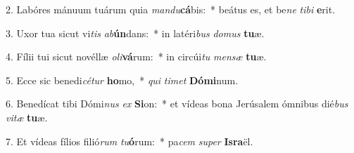 2. Labóres mánuum tuárum quia \textit{man}\textit{du}\textbf{cá}bis:~*  beátus es, et be\textit{ne} \textit{ti}\textit{bi} \textbf{e}rit.\

3. Uxor tua sicut vi\textit{tis} \textit{ab}\textbf{ún}dans:~*  in latéri\textit{bus} \textit{do}\textit{mus} \textbf{tu}æ.\

4. Fílii tui sicut novéllæ \textit{o}\textit{li}\textbf{vá}rum:~*  in circúi\textit{tu} \textit{men}\textit{sæ} \textbf{tu}æ.\

5. Ecce sic benedi\textit{cé}\textit{tur} \textbf{ho}mo,~*  \textit{qui} \textit{ti}\textit{met} \textbf{Dó}\textbf{mi}num.\

6. Benedícat tibi Dómi\textit{nus} \textit{ex} \textbf{Si}on:~*  et vídeas bona Jerúsalem ómnibus dié\textit{bus} \textit{vi}\textit{tæ} \textbf{tu}æ.\

7. Et vídeas fílios filió\textit{rum} \textit{tu}\textbf{ó}rum:~*  pa\textit{cem} \textit{su}\textit{per} \textbf{Is}\textbf{ra}ël.\

